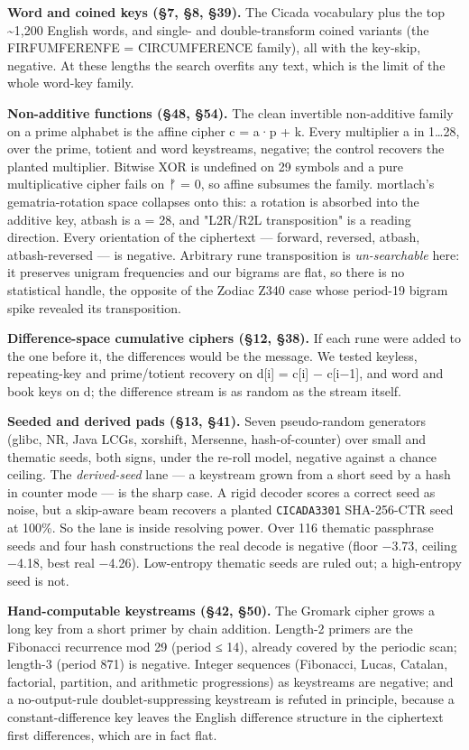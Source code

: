 \documentclass[11pt]{article}
\begin{document}
\textbf{Word and coined keys (§7, §8, §39).} The Cicada vocabulary plus the top \textasciitilde{}1,200 English words, and single- and double-transform coined variants (the FIRFUMFERENFE = CIRCUMFERENCE family), all with the key-skip, negative. At these lengths the search overfits any text, which is the limit of the whole word-key family.


\textbf{Non-additive functions (§48, §54).} The clean invertible non-additive family on a prime alphabet is the affine cipher c = a·p + k. Every multiplier a in 1…28, over the prime, totient and word keystreams, negative; the control recovers the planted multiplier. Bitwise XOR is undefined on 29 symbols and a pure multiplicative cipher fails on ᚠ = 0, so affine subsumes the family. mortlach's gematria-rotation space collapses onto this: a rotation is absorbed into the additive key, atbash is a = 28, and "L2R/R2L transposition" is a reading direction. Every orientation of the ciphertext — forward, reversed, atbash, atbash-reversed — is negative. Arbitrary rune transposition is \emph{un-searchable} here: it preserves unigram frequencies and our bigrams are flat, so there is no statistical handle, the opposite of the Zodiac Z340 case whose period-19 bigram spike revealed its transposition.


\textbf{Difference-space cumulative ciphers (§12, §38).} If each rune were added to the one before it, the differences would be the message. We tested keyless, repeating-key and prime/totient recovery on d[i] = c[i] − c[i−1], and word and book keys on d; the difference stream is as random as the stream itself.


\textbf{Seeded and derived pads (§13, §41).} Seven pseudo-random generators (glibc, NR, Java LCGs, xorshift, Mersenne, hash-of-counter) over small and thematic seeds, both signs, under the re-roll model, negative against a chance ceiling. The \emph{derived-seed} lane — a keystream grown from a short seed by a hash in counter mode — is the sharp case. A rigid decoder scores a correct seed as noise, but a skip-aware beam recovers a planted \texttt{CICADA3301} SHA-256-CTR seed at 100\%. So the lane is inside resolving power. Over 116 thematic passphrase seeds and four hash constructions the real decode is negative (floor −3.73, ceiling −4.18, best real −4.26). Low-entropy thematic seeds are ruled out; a high-entropy seed is not.


\textbf{Hand-computable keystreams (§42, §50).} The Gromark cipher grows a long key from a short primer by chain addition. Length-2 primers are the Fibonacci recurrence mod 29 (period ≤ 14), already covered by the periodic scan; length-3 (period 871) is negative. Integer sequences (Fibonacci, Lucas, Catalan, factorial, partition, and arithmetic progressions) as keystreams are negative; and a no-output-rule doublet-suppressing keystream is refuted in principle, because a constant-difference key leaves the English difference structure in the ciphertext first differences, which are in fact flat.
\end{document}
